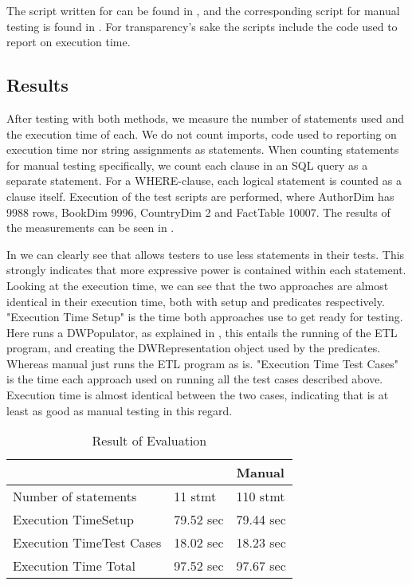 The script written for \FW{} can be found in , and the corresponding script for manual testing is found in . For transparency's sake the scripts include the code used to report on execution time.

\subsection{Results}
After testing with both methods, we measure the number of statements used and the execution time of each. We do not count imports, code used to reporting on execution time nor string assignments as statements.  When counting statements for manual testing specifically, we count each clause in an SQL query as a separate statement. For a WHERE-clause, each logical statement is counted as a clause itself. Execution of the test scripts are performed, where AuthorDim has 9988 rows, BookDim 9996, CountryDim 2 and FactTable 10007. The results of the measurements can be seen in .

In  we can clearly see that \FW{} allows testers to use less statements in their tests. This strongly indicates that more expressive power is contained within each statement. Looking at the execution time, we can see that the two approaches are almost identical in their execution time, both with setup and predicates respectively. "Execution Time Setup" is the time both approaches use to get ready for testing. Here \FW{} runs a DWPopulator, as explained in , this entails the running of the ETL program, and creating the DWRepresentation object used by the predicates. Whereas manual just runs the ETL program as is. "Execution Time Test Cases" is the time each approach used on running all the test cases described above. Execution time is almost identical between the two cases, indicating that \FW{} is at least as good as manual testing in this regard.

\begin{table}[h]
\centering
\caption{Result of Evaluation}
\label{table:result}
\begin{tabular}{|p{}|p{}|p{}|}
\hline
																			 & \FW{} 	& Manual \\ \hline
Number of statements 									 & 11 stmt 		 & 110 stmt 	 \\ \hline
Execution Time\newline Setup 					 & 79.52 sec & 79.44 sec \\ \hline
Execution Time\newline Test Cases 			 & 18.02 sec & 18.23 sec \\ \hline
Execution Time Total 										 & 97.52 sec & 97.67 sec \\ \hline

\end{tabular}
\end{table}